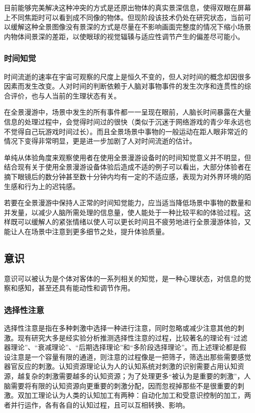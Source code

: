 目前能够完美解决这种冲突的方式是还原出物体的真实景深信息，使得双眼在屏幕上不同焦距时可以看到成不同像的物体。但现阶段该技术仍处在研究状态，当前可以缓解这种全景图像没有景深的方式是尽量在不影响画面完整度的情况下缩小场景内物体间景深的差距，以使眼球的视觉辐辏与适应性调节产生的偏差尽可能小。

\subsubsection{时间知觉}
时间流逝的速率在宇宙可观察的尺度上是恒久不变的，但人对时间的概念却因很多因素而发生改变。人对时间的判断依赖于人脑对事物事件的发生次序和连贯性的综合评价，也与人当前的生理状态有关。

在全景漫游中，场景中发生的所有事件都一一呈现在眼前，人脑长时间暴露在大量信息的处理过程中，会觉得时间过的很快（类似于沉迷于网络游戏的青少年永远也不觉得自己玩游戏时间过长）。而且全景场景中事物的一般运动在距人眼非常近的情况下变得非常明显，更是进一步加剧了人对时间流逝的估计。

单纯从体验角度来观察使用者在使用全景漫游设备时的时间知觉意义并不明显，但结合现有关于使用全景漫游设备体验后造成不适的例子可以看出，大部分体验者在摘下眼镜后的数分钟甚至数十分钟内均有一定的不适应感，表现为对外界环境的陌生感和行为上的迟钝感。

若要在全景漫游中保持人正常的时间知觉能力，应当适当降低场景中事物的数量和并发量，以减少人脑所需处理的信息量，使人能处于一种比较平和的体验过程。这样既可以缓解人的紧张情绪以使人可以更长时间且不疲劳地进行全景漫游体验，又能让人在场景中注意到更多细节之处，提升体验质量。

\subsection{意识}
意识可以被认为是个体对客体的一系列相关的知觉，是一种心理状态，对信息的觉察和感知，甚至还具有能动性和调节作用。

\subsubsection{选择性注意}
选择性注意是指在多种刺激中选择一种进行注意，同时忽略或减少注意其他的刺激。现有研究大多是经实验分析推测选择性注意的过程，比较著名的理论有“过滤器理论”、“衰减理论”、“后期选择理论”和“多阶段选择理论”。而上述理论都是假设注意是一个容量有限的通道，则注意的过程像是一把筛子，筛选出那些需要感觉器官反应的刺激。认知资源理论认为人的认知系统对刺激的识别需要占用认知资源，越复杂的刺激需要越多的认知资源；为了处理更多“被认为是重要的刺激”，人脑需要将有限的认知资源向更重要的刺激分配，因而忽视掉那些不是很重要的刺激。双加工理论认为人类的认知加工有两种：自动化加工和受意识控制的加工，两者并行运作，各有各自的认知过程，且可以互相转换、影响。

